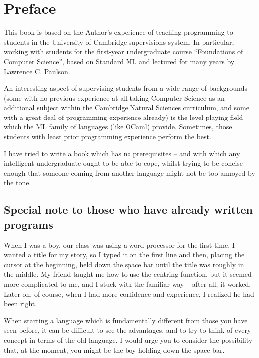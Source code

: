 \documentclass[]{book}
\begin{document}
\clearpage
\small\pagestyle{empty}{\normalfont\tableofcontents}

\chapter*{Preface}
This book is based on the Author's experience of teaching programming to students in the University of Cambridge supervisions system. In particular, working with students for the first-year undergraduate course ``Foundations of Computer Science'', based on Standard ML and lectured for many years by Lawrence C. Paulson.

An interesting aspect of supervising students from a wide range of backgrounds (some with no previous experience at all taking Computer Science as an additional subject within the Cambridge Natural Sciences curriculum, and some with a great deal of programming experience already) is the level playing field which the ML family of languages (like OCaml) provide. Sometimes, those students with least prior programming experience perform the best.

I have tried to write a book which has no prerequisites -- and with which any intelligent undergraduate ought to be able to cope, whilst trying to be concise enough that someone coming from another language might not be too annoyed by the tone.

\section*{Special note to those who have already written programs}
When I was a boy, our class was using a word processor for the first time. I wanted a title for my story, so I typed it on the first line and then, placing the cursor at the beginning, held down the space bar until the title was roughly in the middle. My friend taught me how to use the centring function, but it seemed more complicated to me, and I stuck with the familiar way -- after all, it worked. Later on, of course, when I had more confidence and experience, I realized he had been right.

When starting a language which is fundamentally different from those you have seen before, it can be difficult to see the advantages, and to try to think of every concept in terms of the old language. I would urge you to consider the possibility that, at the moment, you might be the boy holding down the space bar.
\end{document}
